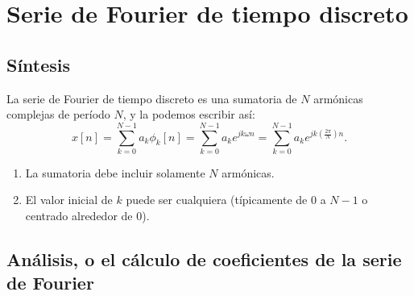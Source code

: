 \documentclass[11pt,a4paper,openany]{book}
\begin{document}
\section{Serie de Fourier de tiempo discreto}

\subsection{Síntesis}

La serie de Fourier de tiempo discreto es una sumatoria de $N$ armónicas complejas de período $N$, y la podemos escribir así:
\begin{equation}
	x[n] = \sum_{k=0}^{N-1} a_{k} \phi_{k}[n] = \sum_{k=0}^{N-1} a_{k} e^{jk\omega n} = \sum_{k=0}^{N-1} a_{k} e^{jk\left(\frac{2\pi}{N}\right)n}.
\end{equation}
\begin{enumerate}
	\item La sumatoria debe incluir solamente $N$ armónicas. 
	\item El valor inicial de $k$ puede ser cualquiera (típicamente de $0$ a $N-1$ o centrado alrededor de $0$).
\end{enumerate}

\subsection{Análisis, o el cálculo de coeficientes de la serie de Fourier}
\end{document}
